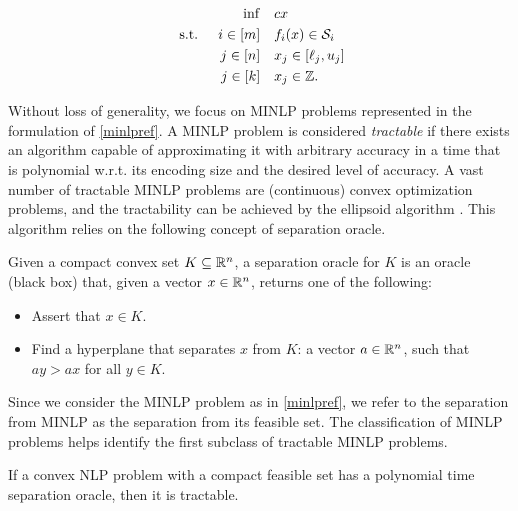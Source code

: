  \begin{subequations}
    \label{minlpref}
    \begin{align}
       \inf &  \quad cx \label{minlpref.obj} \\
    \textup{ s.t. } \quad i \in [m] & \quad f_i(x) \in \mathcal S_i  \label{minlpref.consf} \\
      j \in [n] &  \quad x_j \in [\ell_j, u_j] \label{minlpref.consfbd}\\
      j \in [k] & \quad x_j \in \mathbb Z. \label{minlpref.consint}
    \end{align}
    \end{subequations}


Without loss of generality, we focus on MINLP problems represented in the formulation of \eqref{minlpref}.
A MINLP problem is considered \emph{tractable} if there exists an algorithm capable of approximating it with arbitrary accuracy in a time that is polynomial w.r.t. its encoding size and the desired level of accuracy. 
A vast number of tractable MINLP problems are (continuous) convex optimization problems, and the tractability can be achieved by the ellipsoid algorithm \cite{ecker1983ellipsoid}. This algorithm relies on the following concept of separation oracle.

\begin{definition}
  Given a compact convex set $K \subseteq \mathbb R^n$,  a separation oracle for $K$ is an oracle (black box) that, given a vector $x\in \mathbb R^n$, returns one of the following:
  \begin{itemize}
      \item  Assert that $x \in  K$.
      \item  Find a hyperplane that separates $x$ from $K$: a vector $a \in \mathbb R^n$, such that $a  y > a x$  for all $y \in K$.
  \end{itemize}
\end{definition} 

Since we consider the MINLP problem as in \eqref{minlpref}, we refer to
 the separation from MINLP as the separation from its feasible set. The classification of MINLP problems  helps identify the first subclass of tractable MINLP problems.

\begin{lemma}
If a convex NLP  problem with a compact feasible set has a  polynomial time separation oracle, then it is tractable.
\end{lemma}





